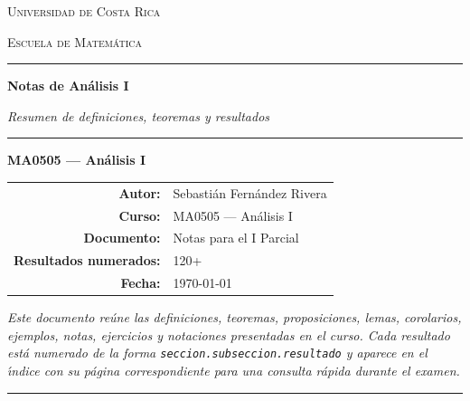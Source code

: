 \documentclass[11pt,twoside]{article}
\newcounter{result}[subsection]
\begin{document}
\begin{titlepage}
\thispagestyle{empty}
\centering

\vspace*{1.5cm}

{\scshape\Large Universidad de Costa Rica\par}
\vspace{0.3cm}
{\scshape\large Escuela de Matem\'atica\par}

\vspace{1.2cm}

{\color{blue!50!black}\rule{\textwidth}{1.2pt}}
\vspace{0.6cm}

{\Huge\bfseries Notas de An\'alisis I\par}

\vspace{0.5cm}

{\Large\itshape Resumen de definiciones, teoremas y resultados\par}

\vspace{0.4cm}
{\color{blue!50!black}\rule{\textwidth}{1.2pt}}

\vspace{1.4cm}

{\Large\bfseries MA0505 --- An\'alisis I\par}

\vspace{2.2cm}

\begin{tabular}{rl}
\textbf{Autor:}              & Sebasti\'{a}n Fern\'{a}ndez Rivera \\[4pt]
\textbf{Curso:}              & MA0505 --- An\'alisis I \\[4pt]
\textbf{Documento:}          & Notas para el I Parcial \\[4pt]
\textbf{Resultados numerados:} & 120+ \\[4pt]
\textbf{Fecha:}              & \today
\end{tabular}

\vfill

\begin{minipage}{0.85\textwidth}
\centering
\itshape
Este documento re\'{u}ne las definiciones, teoremas, proposiciones, lemas, corolarios, ejemplos, notas, ejercicios y notaciones presentadas en el curso. Cada resultado est\'{a} numerado de la forma \texttt{seccion.subseccion.resultado} y aparece en el \'{\i}ndice con su p\'{a}gina correspondiente para una consulta r\'{a}pida durante el examen.
\end{minipage}

\vspace{1cm}

{\color{blue!50!black}\rule{0.5\textwidth}{0.6pt}}

\end{titlepage}
\end{document}
